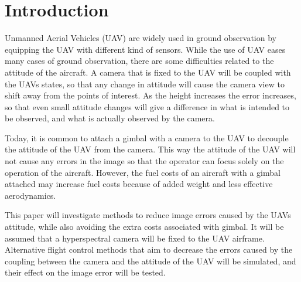 \section{Introduction}

Unmanned Aerial Vehicles (UAV) are widely used in ground observation by equipping the UAV with different kind of sensors. While the use of UAV eases many cases of ground observation, there are some difficulties related to the attitude of the aircraft. A camera that is fixed to the UAV will be coupled with the UAVs states, so that any change in attitude will cause the camera view to shift away from the points of interest. As the height increases the error increases, so that even small attitude changes will give a difference in what is intended to be observed, and what is actually observed by the camera.

Today, it is common to attach a gimbal with a camera to the UAV to decouple the attitude of the UAV from the camera. This way the attitude of the UAV will not cause any errors in the image so that the operator can focus solely on the operation of the aircraft. However, the fuel costs of an aircraft with a gimbal attached may increase fuel costs because of added weight and less effective aerodynamics.

This paper will investigate methods to reduce image errors caused by the UAVs attitude, while also avoiding the extra costs associated with gimbal. It will be assumed that a hyperspectral camera will be fixed to the UAV airframe. Alternative flight control methods that aim to decrease the errors caused by the coupling between the camera and the attitude of the UAV will be simulated, and their effect on the image error will be tested.